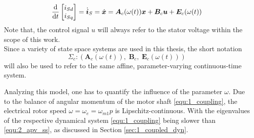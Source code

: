 \[
\dfrac{\mathrm{d}}{\mathrm{d} t} \begin{bmatrix}
		i_{Sd} \\i_{Sq}
	\end{bmatrix} 
    = \dot{\bm{i}}_S = \dot{\bm x} 
    = \bm{A}_c (\omega(t)) {\bm{x}} + \bm{B}_c \bm{u} + \bm{E}_c (\omega(t))
\]
Note that, the control signal $u$ will always refer to the stator voltage within the scope of this work.\\
Since a variety of state space systems are used in this thesis, the short notation 
\[
\Sigma_c : \left(\bm{A}_c \left(\omega \left(t\right) \right),\; \bm{B}_c,\; \bm{E}_c \left(\omega \left(t\right) \right) \right) 
\]
will also be used to refer to the same affine, parameter-varying continuous-time system.\\

Analyzing this model, one has to quantify the influence of the parameter $\omega$. Due to the balance of angular momentum of the motor shaft \eqref{equ:1_coupling}, the electrical rotor speed $\omega = \omega_e = \omega_{m1}p$ is Lipschitz-continuous. With the eigenvalues of the respective dynamical system \eqref{equ:1_coupling} being slower than \eqref{equ:2_apv_ss}, as discussed in Section \ref{sec:1_coupled_dyn}.


